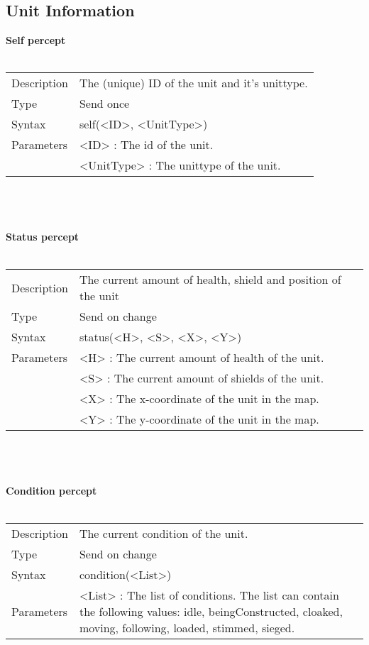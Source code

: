 \documentclass[english,11pt]{report}
\begin{document}
\subsection{Unit Information}
\textbf{Self percept}\\
\\
\begin{tabularx}{\textwidth}{lX}
 Description & The (unique) ID of the unit and it's unittype. \\
 Type & Send once \\
 Syntax & self(<ID>, <UnitType>) \\
 Parameters & <ID> : The id of the unit. \\
            & <UnitType> : The unittype of the unit.
\end{tabularx}\\
\\
\\
\textbf{Status percept}\\
\\
\begin{tabularx}{\textwidth}{lX}
 Description & The current amount of health, shield and position of the unit \\
 Type & Send on change \\
 Syntax & status(<H>, <S>, <X>, <Y>) \\
 Parameters & <H> : The current amount of health of the unit. \\
            & <S> : The current amount of shields of the unit. \\
            & <X> : The x-coordinate of the unit in the map. \\
            & <Y> : The y-coordinate of the unit in the map.
\end{tabularx}\\
\\
\\
\noindent
\textbf{Condition percept}\\
\\
\begin{tabularx}{\textwidth}{lX}
 Description & The current condition of the unit. \\
 Type & Send on change \\
 Syntax & condition(<List>) \\
 Parameters &  <List> : The list of conditions. The list can contain the following values: idle, beingConstructed, cloaked, moving, following, loaded, stimmed, sieged. 
\end{tabularx}
\\
\end{document}
